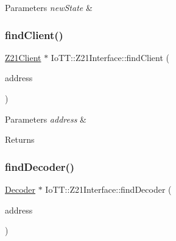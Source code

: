 \begin{DoxyParams}{Parameters}
{\em new\+State} & \\
\hline
\end{DoxyParams}
\mbox{\label{classIoTT_1_1Z21Interface_a51664ae9f82efff951003723efbcd55b}} 
\subsubsection{\texorpdfstring{find\+Client()}{findClient()}}
{\footnotesize\ttfamily \hyperlink{classIoTT_1_1Z21Client}{Z21\+Client} $\ast$ Io\+T\+T\+::\+Z21\+Interface\+::find\+Client (\begin{DoxyParamCaption}\item[{const sockaddr\+\_\+in \&}]{address }\end{DoxyParamCaption})\hspace{0.3cm}{\ttfamily [protected]}}


\begin{DoxyParams}{Parameters}
{\em address} & \\
\hline
\end{DoxyParams}
\begin{DoxyReturn}{Returns}

\end{DoxyReturn}
\mbox{\label{classIoTT_1_1Z21Interface_a81a8f1e4962c7b47849ec233dd1364af}} 
\subsubsection{\texorpdfstring{find\+Decoder()}{findDecoder()}}
{\footnotesize\ttfamily \hyperlink{classIoTT_1_1Decoder}{Decoder} $\ast$ Io\+T\+T\+::\+Z21\+Interface\+::find\+Decoder (\begin{DoxyParamCaption}\item[{const \hyperlink{namespaceIoTT_a31b8cd9473fc447b3fb341b78afa54fe}{D\+C\+C\+Address\+\_\+t} \&}]{address }\end{DoxyParamCaption})\hspace{0.3cm}{\ttfamily [protected]}}


